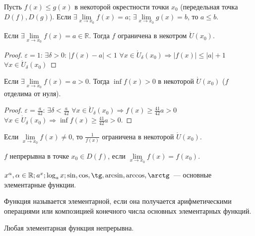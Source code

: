 \documentclass{article}
\begin{document}
	\begin{lemma}
		Пусть $f(x) \leqslant g(x)$ в некоторой окрестности точки $x_0$ (передельная точка $D(f), D(g)$). Если $\exists \lim \limits_{x \rightarrow x_0} f(x) = a$; $\exists \lim \limits_{x \rightarrow x_0} g(x) = b$, то $a \leqslant b$.
	\end{lemma}
	\begin{lemma}[Об ограниченности]
		Если $\exists \lim \limits_{x \rightarrow x_0} f(x) = a \in \mathbb{R}$. Тогда $f$ ограничена в некотром $\mathring{U}(x_0)$.
	\end{lemma}
	\begin{proof}
		$\varepsilon = 1$: $\exists \delta > 0$: $|f(x) - a| < 1$ $\forall x \in \mathring{U}_{\delta}(x_0) \Rightarrow |f(x)| \leqslant |a| + 1$ $\forall x \in \mathring{U}_{\delta}(x_0)$
	\end{proof}
	\begin{lemma}
		Если $\exists \lim \limits_{x \rightarrow x_0} f(x) = a > 0$. Тогда $\inf f(x) > 0$ в некоторой $\mathring{U}(x_0)$ ($f$ отделима от нуля).
	\end{lemma}
	\begin{proof}
		$\varepsilon = \frac{a}{42}$: $\exists \delta < \frac{a}{42}$ $\forall x \in \mathring{U}_{\delta}(x_0) \Rightarrow f(x) \geqslant \frac{41}{42}a > 0$ $\forall x \in \mathring{U}_{\delta}(x_0) \Rightarrow \inf f(x) \geqslant \frac{41}{42}a > 0$.
	\end{proof}
	\begin{corollary}
		Если $\lim \limits_{x \rightarrow x_0} f(x) \not= 0$, то $\frac{1}{f(x)}$ ограничена в некоторой $\mathring{U}(x_0)$.
	\end{corollary}
	\begin{definition}
		$f$ непрерывна в точке $x_0 \in D(f)$, если $\lim \limits_{x \rightarrow x_0} f(x) = f(x_0)$.
	\end{definition}
	\begin{definition}
		$x^{\alpha}, \alpha \in \mathbb{R}; a^x; \log_ax; \sin, \cos, \tg, \arcsin, \arccos, \arctg$~--- основные элементарные функции.
	\end{definition}
	\begin{definition}
		Функция называется элементарной, если она получается арифметическими операциями или композицией конечного числа основных элементарных функций.
	\end{definition}
	\begin{statement}
		Любая элементарная функция непрерывна.
	\end{statement}
\end{document}
